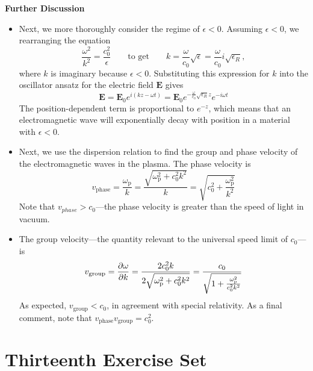 \documentclass[11pt, a4paper]{article}
\newcommand{\eqtext}[1]{\qquad \text{#1} \qquad}
\renewcommand{\vec}[1]{\bm{#1}} %
\newcommand{\E}{\vec{E}}  %
\newcommand{\e}{\epsilon}
\begin{document}
\textbf{Further Discussion}	
\begin{itemize}
	
	\item Next, we more thoroughly consider the regime of $ \e < 0 $. Assuming $ \e < 0 $, we rearranging the equation 
	\begin{equation*}
		\frac{\omega^{2}}{k^{2}} = \frac{c_{0}^{2}}{\e} \eqtext{to get} k = \frac{\omega}{c_{0}}\sqrt{\e}  = \frac{\omega}{c_{0}}i \sqrt{\e_{R}},
	\end{equation*}
	where $ k $ is imaginary because $ \e < 0 $. Substituting this expression for $ k $ into the oscillator ansatz for the electric field $ \E $ gives
	\begin{equation*}
		\E = \E_{0} e^{i(kz - \omega t)} = \E_{0}e^{-\frac{\omega}{c_{0}}\sqrt{\e_{R}}z}e^{-i\omega t}
	\end{equation*}
	The position-dependent term is proportional to $ e^{-z} $, which means that an electromagnetic wave will exponentially decay with position in a material with $ \e < 0 $. 
	
	\item Next, we use the dispersion relation to find the group and phase velocity of the electromagnetic waves in the plasma. The phase velocity is 
	\begin{equation*}
		v_{\text{phase}} = \frac{\omega_{\mathrm{p}}}{k} = \frac{\sqrt{\omega_{\mathrm{p}}^{2} + c_{0}^{2}k^{2}}}{k} = \sqrt{c_{0}^{2} + \frac{\omega_{\mathrm{p}}^{2}}{k^{2}}}
	\end{equation*}
	Note that $ v_{phase} > c_{0} $---the phase velocity is greater than the speed of light in vacuum. 
	
	\item The group velocity---the quantity relevant to the universal speed limit of $ c_{0} $---is 
	\begin{equation*}
		v_{\mathrm{group}} = \pdv{\omega}{k} = \frac{2 c_{0}^{2}k}{2 \sqrt{\omega_{\mathrm{p}}^{2} + c_{0}^{2}k^{2}}} = \frac{c_{0}}{\sqrt{1 + \frac{\omega_{\mathrm{p}}^{2}}{c_{0}^{2}k^{2}}}}
	\end{equation*}
	As expected, $ v_{\mathrm{group}} < c_{0} $, in agreement with special relativity. As a final comment, note that $ v_{\mathrm{phase}}v_{\mathrm{group}} = c_{0}^{2} $.
\end{itemize}

\section{Thirteenth Exercise Set}
\end{document}
